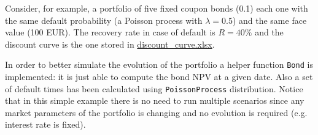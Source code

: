 Consider, for example, a portfolio of five fixed coupon bonds (0.1) each one with the same default probability (a Poisson process with $\lambda=0.5$) and the same face value (100 EUR). The recovery rate in case of default is $R=40\%$ and the discount curve is the one stored in \href{https://github.com/matteosan1/finance_course/raw/master/input_files/discount_factors_2022-10-05.xlsx}{discount\_curve.xlsx}.

In order to better simulate the evolution of the portfolio a helper function \texttt{Bond} is implemented: it is just able to compute the bond NPV at a given date. Also a set of default times has been calculated using \texttt{PoissonProcess} distribution.
Notice that in this simple example there is no need to run multiple scenarios since any market parameters of the portfolio is changing and no evolution is required (e.g. interest rate is fixed).
 
